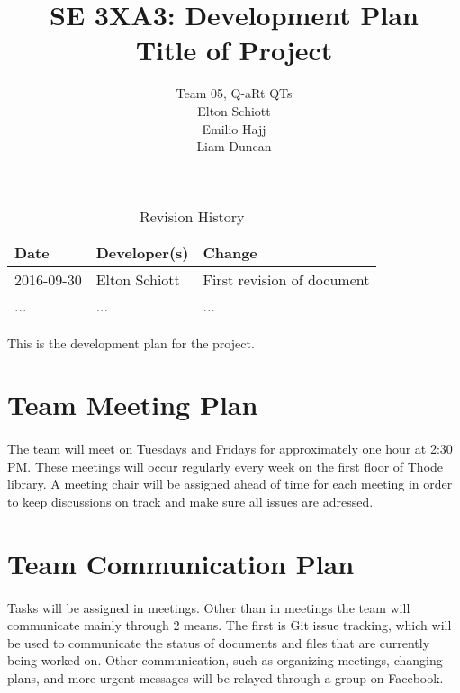 \documentclass{article}
\title{SE 3XA3: Development Plan\\Title of Project}
\author{Team 05, Q-aRt QTs
		\\ Elton Schiott
		\\ Emilio Hajj
		\\ Liam Duncan
}
\date{}
\begin{document}
\begin{table}[hp]
\caption{Revision History} \label{TblRevisionHistory}
\begin{tabularx}{\textwidth}{llX}
\toprule
\textbf{Date} & \textbf{Developer(s)} & \textbf{Change}\\
\midrule
2016-09-30 & Elton Schiott & First revision of document\\
... & ... & ...\\
\bottomrule
\end{tabularx}
\end{table}

\newpage

\maketitle

This is the development plan for the project.

\section{Team Meeting Plan}
	
	\paragraph{}
		
		The team will meet on Tuesdays and Fridays for approximately one hour 
		at 2:30 PM. These meetings will occur regularly every week on the first 
		floor of Thode library. A meeting chair will be assigned ahead of time 
		for each meeting in order to keep discussions on track and make sure 
		all issues are adressed.

\section{Team Communication Plan}
	
	\paragraph{}
	
		Tasks will be assigned in meetings. Other than in meetings the team 
		will communicate mainly through 2 means. The first is Git issue 
		tracking, which will be used to communicate the status of documents and 
		files that are currently being worked on. Other communication, such as 
		organizing meetings, changing plans, and more urgent messages will be 
		relayed through a group on Facebook.
\end{document}
